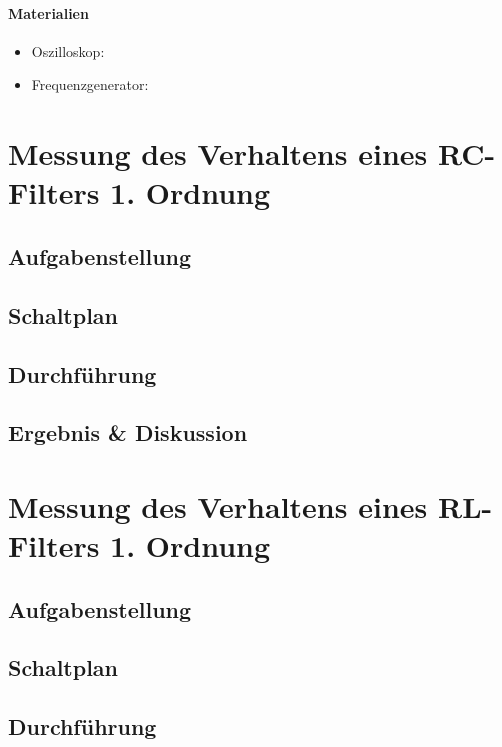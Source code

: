 \documentclass[12pt,a4paper,titlepage]{article}
\begin{document}
\setcounter{page}{2}

\newpage
\setcounter{tocdepth}{1}
\tableofcontents

\newpage

\paragraph{Materialien}
\begin{itemize}
	\item Oszilloskop:
	\item Frequenzgenerator:
\end{itemize}

\section{Messung des Verhaltens eines RC-Filters 1. Ordnung}

\subsection{Aufgabenstellung}

\subsection{Schaltplan}

\subsection{Durchf\"uhrung}

\subsection{Ergebnis \& Diskussion}

\section{Messung des Verhaltens eines RL-Filters 1. Ordnung}

\subsection{Aufgabenstellung}

\subsection{Schaltplan}

\subsection{Durchf\"uhrung}
\end{document}
